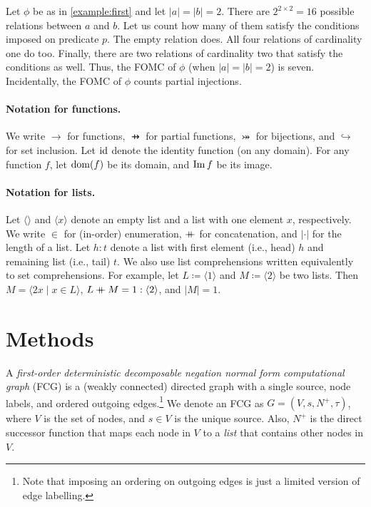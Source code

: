 \begin{example}
  Let $\phi$ be as in \cref{example:first} and let $|a| = |b| = 2$. There are
  $2^{2 \times 2} = 16$ possible relations between $a$ and $b$. Let us count how
  many of them satisfy the conditions imposed on predicate $p$. The empty
  relation does. All four relations of cardinality one do too. Finally, there
  are two relations of cardinality two that satisfy the conditions as well.
  Thus, the FOMC of $\phi$ (when $|a| = |b| = 2$) is seven. Incidentally, the
  FOMC of $\phi$ counts partial injections.
\end{example}

\paragraph*{Notation for functions.}
We write $\to$ for functions, $\pfun$ for partial functions,
$\twoheadrightarrowtail$ for bijections, and $\hookrightarrow$ for set
inclusion. Let $\operatorname{id}$ denote the identity function (on any domain). For any
function $f$, let $\operatorname{dom}(f)$ be its domain, and $\operatorname{Im} f$ be its image.

\paragraph*{Notation for lists.}
Let $\langle\rangle$ and $\langle x \rangle$ denote an empty list and a list
with one element $x$, respectively. We write $\in$ for (in-order) enumeration,
$\mathbin{+\mkern-10mu+}$ for concatenation, and $|\cdot|$ for the length of a list. Let
$h : t$ denote a list with first element (i.e., head) $h$ and remaining list
(i.e., tail) $t$. We also use list comprehensions written equivalently to set
comprehensions. For example, let $L \coloneqq \langle 1 \rangle$ and
$M \coloneqq \langle 2 \rangle$ be two lists. Then
$M = \langle 2x \mid x \in L \rangle$,
$L \mathbin{+\mkern-10mu+} M = 1 : \langle 2 \rangle$, and $|M| = 1$.

\section{Methods}


A \emph{first-order deterministic decomposable negation normal form
  computational graph} (FCG) is a (weakly connected) directed graph with a
single source, node labels, and ordered outgoing edges.\footnote{Note that
  imposing an ordering on outgoing edges is just a limited version of edge
  labelling.} We denote an FCG as $G = (V, s, N^+, \tau)$, where $V$ is the set
of nodes, and $s \in V$ is the unique source. Also, $N^+$ is the direct
successor function that maps each node in $V$ to a \emph{list} that contains
other nodes in $V$.

